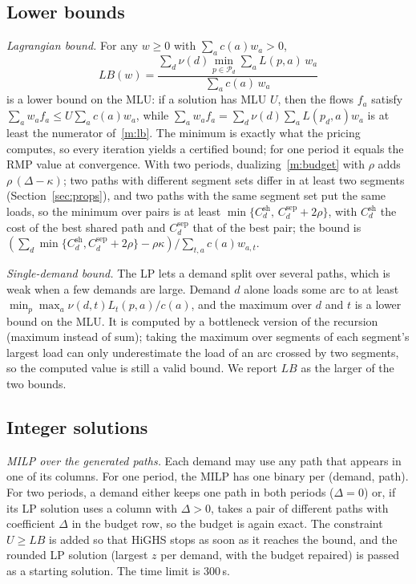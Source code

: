 \documentclass[conference]{IEEEtran}
\begin{document}
\subsection{Lower bounds}
\emph{Lagrangian bound.} For any $w\ge0$ with $\sum_a c(a)w_a>0$,
\begin{equation}
LB(w)=\frac{\sum_d\nu(d)\min_{p\in\mathcal P_d}\sum_a L(p,a)\,w_a}{\sum_a c(a)\,w_a}\label{m:lb}
\end{equation}
is a lower bound on the MLU: if a solution has MLU $U$, then the flows $f_a$ satisfy $\sum_a w_af_a\le U\sum_a c(a)w_a$, while $\sum_a w_af_a=\sum_d\nu(d)\sum_a L(p_d,a)w_a$ is at least the numerator of~\eqref{m:lb}. The minimum is exactly what the pricing computes, so every iteration yields a certified bound; for one period it equals the RMP value at convergence. With two periods, dualizing~\eqref{m:budget} with $\rho$ adds $\rho\,(\Delta-\kappa)$; two paths with different segment sets differ in at least two segments (Section~\ref{sec:props}), and two paths with the same segment set put the same loads, so the minimum over pairs is at least $\min\{C^{\mathrm{sh}}_d,\,C^{\mathrm{sep}}_d+2\rho\}$, with $C^{\mathrm{sh}}_d$ the cost of the best shared path and $C^{\mathrm{sep}}_d$ that of the best pair; the bound is $(\sum_d\min\{C^{\mathrm{sh}}_d,C^{\mathrm{sep}}_d+2\rho\}-\rho\kappa)/\sum_{t,a}c(a)w_{a,t}$.

\emph{Single-demand bound.} The LP lets a demand split over several paths, which is weak when a few demands are large. Demand $d$ alone loads some arc to at least $\min_p\max_a\nu(d,t)L_t(p,a)/c(a)$, and the maximum over $d$ and $t$ is a lower bound on the MLU. It is computed by a bottleneck version of the recursion (maximum instead of sum); taking the maximum over segments of each segment's largest load can only underestimate the load of an arc crossed by two segments, so the computed value is still a valid bound. We report $LB$ as the larger of the two bounds.

\subsection{Integer solutions}
\emph{MILP over the generated paths.} Each demand may use any path that appears in one of its columns. For one period, the MILP has one binary per (demand, path). For two periods, a demand either keeps one path in both periods ($\Delta=0$) or, if its LP solution uses a column with $\Delta>0$, takes a pair of different paths with coefficient $\Delta$ in the budget row, so the budget is again exact. The constraint $U\ge LB$ is added so that HiGHS stops as soon as it reaches the bound, and the rounded LP solution (largest $z$ per demand, with the budget repaired) is passed as a starting solution. The time limit is 300\,s.
\end{document}
